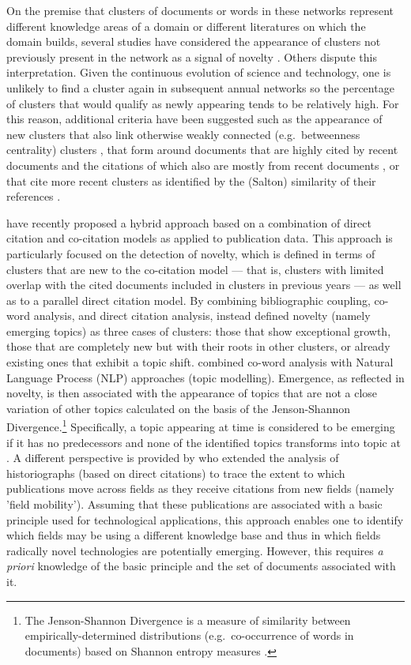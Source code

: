 \documentclass[11pt]{article}
\begin{document}
On the premise that clusters of documents or words in these networks represent different knowledge areas of a domain or different literatures on which the domain builds, several studies have considered the appearance of clusters not previously present in the network as a signal of novelty \citep[e.g.][]{Erdi2012,Kajikawa2008}. Others dispute this interpretation. Given the continuous evolution of science and technology, one is unlikely to find a cluster again in subsequent annual networks so the percentage of clusters that would qualify as newly appearing tends to be relatively high. For this reason, additional criteria have been suggested such as the appearance of new clusters that also link otherwise weakly connected (e.g.\ betweenness centrality) clusters \citep[e.g.][]{Shibata2011,Furukawa2015}, that form around documents that are highly cited by recent documents and the citations of which also are mostly from recent documents \citep{Breitzman2015}, or that cite more recent clusters as identified by the (Salton) similarity of their references \citep{Morris2003}.

\cite{Small2014} have recently proposed a hybrid approach based on a combination of direct citation and co-citation models as applied to publication data. This approach is particularly focused on the detection of novelty, which is defined in terms of clusters that are new to the co-citation model --- that is, clusters with limited overlap with the cited documents included in clusters in previous years \citep{Boyack2014} --- as well as to a parallel direct citation model. By combining bibliographic coupling, co-word analysis, and direct citation analysis, \cite{Glanzel2012} instead defined novelty (namely emerging topics) as three cases of clusters: those that show exceptional growth, those that are completely new but with their roots in other clusters, or already existing ones that exhibit a topic shift.  \cite{Yan2014} combined co-word analysis with Natural Language Process (NLP) approaches (topic modelling). Emergence, as reflected in novelty, is then associated with the appearance of topics that are not a close variation of other topics calculated on the basis of the Jenson-Shannon Divergence.\footnote{The Jenson-Shannon Divergence is a measure of similarity between empirically-determined distributions (e.g.\ co-occurrence of words in documents) based on Shannon entropy measures \citep[for more details see][]{Lin1991}.} Specifically, a topic  appearing at time  is considered to be emerging if it has no predecessors and none of the identified topics transforms into topic  at . A different perspective is provided by \cite{Scharnhorst2010} who extended the analysis of historiographs (based on direct citations) to trace the extent to which publications move across fields as they receive citations from new fields (namely 'field mobility'). Assuming that these publications are associated with a basic principle used for technological applications, this approach enables one to identify which fields may be using a different knowledge base and thus in which fields radically novel technologies are potentially emerging. However, this requires \textit{a priori} knowledge of the basic principle and the set of documents associated with it.
\end{document}
